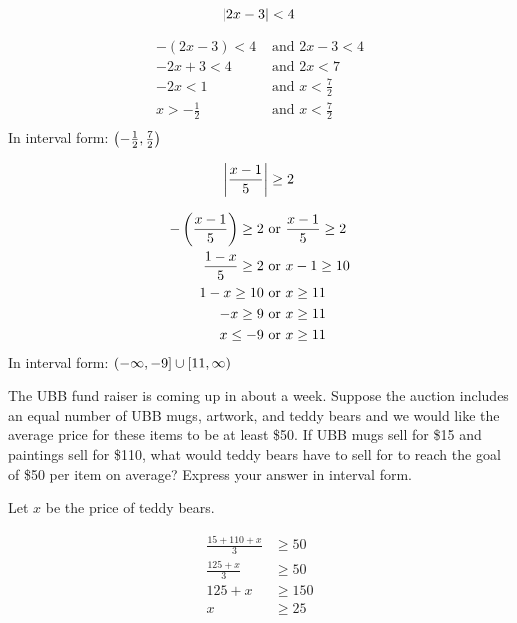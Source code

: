 \documentclass[letterpaper, landscape]{exam}
\begin{document}
\begin{questions}
    \question[7]
      \[ 
        \abs{ 2x - 3 } < 4 
      \]

      \begin{solution}
        \begin{align*}
          -(2x - 3) < 4    & \text{ and } 2x - 3 < 4 \\
          -2x + 3 < 4      & \text{ and } 2x < 7 \\
          -2x < 1          & \text{ and } x < \frac{7}{2} \\
          x > -\frac{1}{2} & \text{ and } x < \frac{7}{2} \\
        \end{align*}
        In interval form: $\intoo{ -\frac{1}{2}, \frac{7}{2} }$
      \end{solution}

      \question[7]
        \[ 
          \abs{ \frac{x - 1}{5} } \geq 2 
        \]
        \begin{solution}
          \begin{align*}
            -\del{ \frac{x - 1}{5} } \geq 2 & \text{ or } \frac{x - 1}{5} \geq 2 \\
            \frac{1 - x}{5} \geq 2          & \text{ or } x - 1 \geq 10 \\
            1 - x \geq 10                   & \text{ or } x \geq 11 \\
            -x \geq 9                       & \text{ or } x \geq 11 \\
            x \leq -9                       & \text{ or } x \geq 11 \\
          \end{align*}
          In interval form: $\intoc{ -\infty, -9 } \cup \intco{ 11, \infty }$
        \end{solution}

    \question[10]\label{inequality:last}

    The UBB fund raiser is coming up in about a week.  Suppose the auction
    includes an equal number of UBB mugs, artwork, and teddy bears and we would
    like the average price for these items to be at least \$50.  If UBB mugs
    sell for \$15 and paintings sell for \$110, what would teddy bears have to
    sell for to reach the goal of \$50 per item on average?  Express your
    answer in interval form.

    \begin{solution}
      Let $x$ be the price of teddy bears.

      \begin{align*}
        \frac{15 + 110 + x}{3} & \geq 50 \\
        \frac{125 + x}{3}      & \geq 50 \\
        125 + x                & \geq 150 \\
        x                      & \geq 25 \\
      \end{align*}


\end{solution}
\end{questions}
\end{document}
